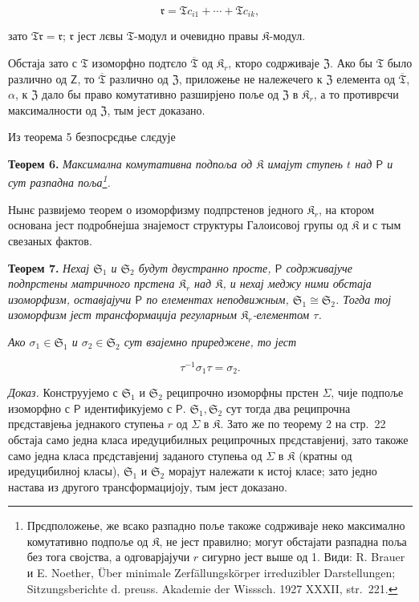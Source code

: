 \documentclass[11pt]{article}
\newcommand{\srcfn}[2]{\footnote{#2}}
\newcommand{\foreign}[1]{#1}
\begin{document}
\[
\mathfrak r=\mathfrak T c_{i1}+\cdots+\mathfrak T c_{ik},
\]

зато \(\mathfrak T\mathfrak r=\mathfrak r\); \(\mathfrak r\) јест лєвы \(\mathfrak T\)-модул и очевидно правы \(\mathfrak K\)-модул.

Обстаја зато с \(\mathfrak T\) изоморфно подтєло \(\overline{\mathfrak T}\) од \(\mathfrak K_r\), кторо содрживаје \(\mathfrak Z\). Ако бы \(\mathfrak T\) было различно од \(\mathsf{Z}\), то \(\overline{\mathfrak T}\) различно од \(\mathfrak Z\), приложење не належечего к \(\mathfrak Z\) елемента од \(\overline{\mathfrak T}\), \(\alpha\), к \(\mathfrak Z\) дало бы право комутативно разширјено поље од \(\mathfrak Z\) в \(\mathfrak K_r\), а то противрєчи максималности од \(\mathfrak Z\), тым јест доказано.

Из теорема 5 безпосрєдње слєдује

\textbf{Теорем 6.} \emph{Максимална комутативна подпоља од \(\mathfrak K\) имајут ступењ \(t\) над \(\mathsf P\) и сут разпадна поља\srcfn{1}{Прєдположење, же всако разпадно поље такоже содрживаје неко максимално комутативно подпоље од \(\mathfrak K\), не јест правилно; могут обстајати разпадна поља без тога својства, а одговарјајучи \(r\) сигурно јест выше од 1. Види: \foreign{R. Brauer} и \foreign{E. Noether}, \foreign{Über minimale Zerfällungskörper irreduzibler Darstellungen; Sitzungsberichte d. preuss. Akademie der Wisssch. 1927 XXXII, str.~221.}}.}

Нынє развијемо теорем о изоморфизму подпрстенов једного \(\mathfrak K_r\), на ктором основана јест подробнејша знајемост структуры Галоисовој групы од \(\mathfrak K\) и с тым свезаных фактов.

\textbf{Теорем 7.} \emph{Нехај \(\mathfrak S_1\) и \(\mathfrak S_2\) будут двустранно просте, \(\mathsf P\) содрживајуче подпрстены матричного прстена \(\mathfrak K_r\) над \(\mathfrak K\), и нехај меджу ними обстаја изоморфизм, оставјајучи \(\mathsf P\) по елементах неподвижным, \(\mathfrak S_1\cong\mathfrak S_2\). Тогда тој изоморфизм јест трансформација регуларным \(\mathfrak K_r\)-елементом \(\tau\).}

\emph{Ако \(\sigma_1\in\mathfrak S_1\) и \(\sigma_2\in\mathfrak S_2\) сут взајемно приреджене, то јест}

\[
\tau^{-1}\sigma_1\tau=\sigma_2.
\]

\emph{Доказ.} Конструујемо с \(\mathfrak S_1\) и \(\mathfrak S_2\) реципрочно изоморфны прстен \(\Sigma\), чије подпоље изоморфно с \(\mathsf P\) идентификујемо с \(\mathsf P\). \(\mathfrak S_1,\mathfrak S_2\) сут тогда два реципрочна прєдставјења једнакого ступења \(r\) од \(\Sigma\) в \(\mathfrak K\). Зато же по теорему 2 на стр.~22 обстаја само једна класа иредуцибилных реципрочных прєдставјениј, зато такоже само једна класа прєдставјениј заданого ступења од \(\Sigma\) в \(\mathfrak K\) (кратны од иредуцибилној класы), \(\mathfrak S_1\) и \(\mathfrak S_2\) морајут належати к истој класе; зато једно настава из другого трансформацијоју, тым јест доказано.
\end{document}
